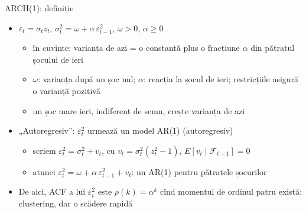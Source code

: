 \begin{frame}{ARCH(1): definiție}
\itemsize{\small}
\begin{itemize}
    \item $\varepsilon_t = \sigma_t z_t$, \quad $\sigma_t^2 = \omega + \alpha\,\varepsilon_{t-1}^2$, \quad $\omega > 0$, $\alpha \ge 0$
    \begin{itemize}
        \item în cuvinte: varianța de azi = o constantă plus o fracțiune $\alpha$ din pătratul șocului de ieri
        \item $\omega$: varianța după un șoc nul; $\alpha$: reacția la șocul de ieri; restricțiile asigură o varianță pozitivă
        \item un șoc mare ieri, indiferent de semn, crește varianța de azi
    \end{itemize}
    \item „Autoregresiv”: $\varepsilon_t^2$ urmează un model AR(1) (autoregresiv)
    \begin{itemize}
        \item scriem $\varepsilon_t^2 = \sigma_t^2 + v_t$, cu $v_t = \sigma_t^2(z_t^2 - 1)$, $E[v_t \mid \mathcal{F}_{t-1}] = 0$
        \item atunci $\varepsilon_t^2 = \omega + \alpha\,\varepsilon_{t-1}^2 + v_t$: un AR(1) pentru pătratele șocurilor
    \end{itemize}
    \item De aici, ACF a lui $\varepsilon_t^2$ este $\rho(k) = \alpha^k$ cînd momentul de ordinul patru există: clustering, dar o scădere rapidă
\end{itemize}
\end{frame}

